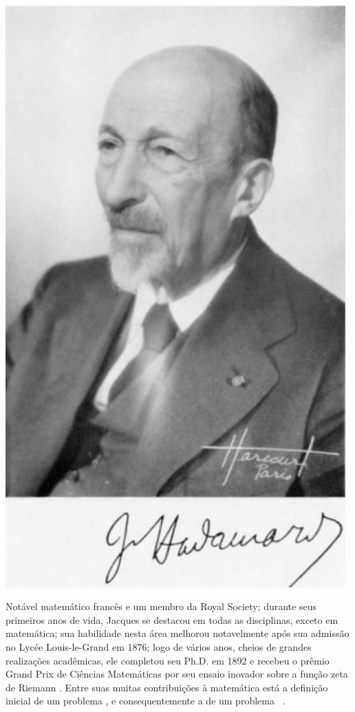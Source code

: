 \begin{elaboracion}[title=Jacques Salomon Hadamard (1865-1963), width= 0.99\linewidth]
\label{elab:Hadamard}
\noindent
\begin{minipage}{0.2\linewidth}
\centering
\includegraphics[width=0.98\textwidth]{chapters/notacao/Hadamard2.jpg}
\end{minipage}
\begin{minipage}{0.8\linewidth}
Notável matemático francês  e um membro da Royal Society;
durante seus primeiros anos de vida, 
Jacques se destacou em todas as disciplinas, exceto em matemática;
sua habilidade nesta área melhorou notavelmente após sua admissão no Lycée Louis-le-Grand em 1876;
logo de vários anos, cheios de  grandes realizações acadêmicas, ele completou seu Ph.D. em 1892 
e recebeu o prêmio Grand Prix de Ciências Matemáticas por seu ensaio inovador sobre a função zeta de Riemann
\cite[pp. 326]{agarwal2014creators}.
Entre suas muitas contribuições à matemática está a definição inicial de um problema \wellposed,
e consequentemente a de um problema \illposed~\cite[pp. 9, 132]{p2011well}.
\end{minipage}
\end{elaboracion}

